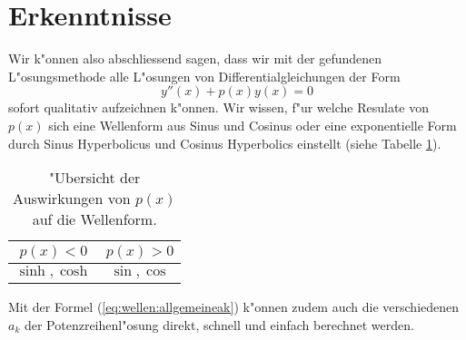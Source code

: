 \section{Erkenntnisse}
Wir k"onnen also abschliessend sagen, dass wir mit der gefundenen 
L"osungsmethode alle L"osungen von Differentialgleichungen der Form 
\begin{equation*}
	y''(x)+p(x)y(x) = 0
\end{equation*}
sofort qualitativ aufzeichnen k"onnen. Wir wissen, f"ur welche Resulate von 
$p(x)$ sich eine Wellenform aus Sinus und Cosinus oder eine exponentielle Form 
durch Sinus Hyperbolicus und Cosinus Hyperbolics einstellt (siehe Tabelle 
\ref{tab:wellen:formoverview}).
\begin{table}
	\centering
	\begin{tabular}{ c | c }
		$p(x) < 0$ & $p(x) > 0$ \\\hline
		$\sinh, \cosh$ & $\sin, \cos$
	\end{tabular}
	\caption{"Ubersicht der Auswirkungen von $p(x)$ auf die Wellenform.}
	\label{tab:wellen:formoverview}
\end{table}
Mit der Formel (\ref{eq:wellen:allgemeineak}) k"onnen zudem auch die 
verschiedenen $a_k$ der Potenzreihenl"osung direkt, schnell und einfach 
berechnet werden.
